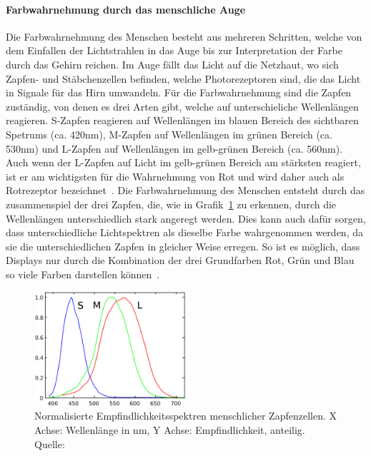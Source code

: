 \documentclass[12pt, a4paper, ngerman]{article}
\begin{document}
\paragraph{Farbwahrnehmung durch das menschliche Auge}
Die Farbwahrnehmung des Menschen besteht aus mehreren Schritten, 
welche von dem Einfallen der Lichtstrahlen in das Auge bis zur Interpretation der Farbe durch das Gehirn reichen.
Im Auge fällt das Licht auf die Netzhaut, wo sich Zapfen- und Stäbchenzellen befinden, 
welche Photorezeptoren sind, die das Licht in Signale für das Hirn umwandeln.
Für die Farbwahrnehmung sind die Zapfen zuständig, von denen es drei Arten gibt, welche auf unterschieliche Wellenlängen reagieren.
S-Zapfen reagieren auf Wellenlängen im blauen Bereich des sichtbaren Spetrums (ca. 420nm), 
M-Zapfen auf Wellenlängen im grünen Bereich (ca. 530nm) und L-Zapfen auf Wellenlängen im gelb-grünen Bereich (ca. 560nm).
Auch wenn der L-Zapfen auf Licht im gelb-grünen Bereich am stärksten reagiert, 
ist er am wichtigsten für die Wahrnehmung von Rot und wird daher auch als Rotrezeptor bezeichnet~\cite{Zapfen_Auge_2023}.
Die Farbwahrnehmung des Menschen entsteht durch das zusammenspiel der drei Zapfen, 
die, wie in Grafik~\ref{fig:LMS} zu erkennen, durch die Wellenlängen unterschiedlich stark angeregt werden. 
Dies kann auch dafür sorgen, dass unterschiedliche Lichtspektren als dieselbe Farbe wahrgenommen werden, 
da sie die unterschiedlichen Zapfen in gleicher Weise erregen. 
So ist es möglich, dass Displays nur durch die Kombination der drei Grundfarben Rot, Grün und Blau 
so viele Farben darstellen können~\cite{Ottosson_2020}.

\begin{figure}
  \centering
  \includegraphics[width=0.5\textwidth]{Grafiken/LMS.png}
  \caption{Normalisierte Empfindlichkeitsspektren menschlicher Zapfenzellen. X Achse: Wellenlänge in nm, Y Achse: Empfindlichkeit, anteilig. Quelle: \cite{LMS_color_space_2023}}
  \label{fig:LMS}
\end{figure}
\end{document}
